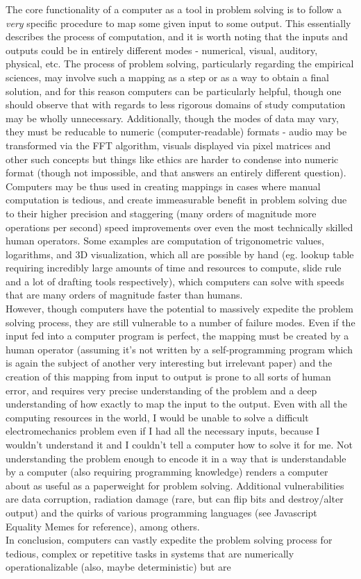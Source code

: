 \documentclass[10pt]{report}
\begin{document}
    The core functionality of a computer as a tool in problem solving is to follow a \textit{very} specific procedure to map some given input to some output. This essentially describes the process of computation, and it is worth noting that the inputs and outputs could be in entirely different modes - numerical, visual, auditory, physical, etc. The process of problem solving, particularly regarding the empirical sciences, may involve such a mapping as a step or as a way to obtain a final solution, and for this reason computers can be particularly helpful, though one should observe that with regards to less rigorous domains of study computation may be wholly unnecessary. Additionally, though the modes of data may vary, they must be reducable to numeric (computer-readable) formats - audio may be transformed via the FFT algorithm, visuals displayed via pixel matrices and other such concepts but things like ethics are harder to condense into numeric format (though not impossible, and that answers an entirely different question). \\Computers may be thus used in creating mappings in cases where manual computation is tedious, and create immeasurable benefit in problem solving due to their higher precision and staggering (many orders of magnitude more operations per second) speed improvements over even the most technically skilled human operators. Some examples are computation of trigonometric values, logarithms, and 3D visualization, which all are possible by hand (eg. lookup table requiring incredibly large amounts of time and resources to compute, slide rule and a lot of drafting tools respectively), which computers can solve with speeds that are many orders of magnitude faster than humans.\\However, though computers have the potential to massively expedite the problem solving process, they are still vulnerable to a number of failure modes. Even if the input fed into a computer program is perfect, the mapping must be created by a human operator (assuming it's not written by a self-programming program which is again the subject of another very interesting but irrelevant paper) and the creation of this mapping from input to output is prone to all sorts of human error, and requires very precise understanding of the problem and a deep understanding of how exactly to map the input to the output. Even with all the computing resources in the world, I would be unable to solve a difficult electromechanics problem even if I had all the necessary inputs, because I wouldn't understand it and I couldn't tell a computer how to solve it for me. Not understanding the problem enough to encode it in a way that is understandable by a computer (also requiring programming knowledge) renders a computer about as useful as a paperweight for problem solving. Additional vulnerabilities are data corruption, radiation damage (rare, but can flip bits and destroy/alter output) and the quirks of various programming languages (see Javascript Equality Memes for reference), among others.\\ In conclusion, computers can vastly expedite the problem solving process for tedious, complex or repetitive tasks in systems that are numerically operationalizable (also, maybe deterministic) but are 
\end{document}
